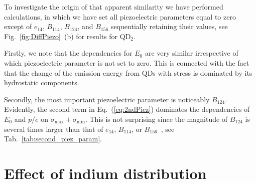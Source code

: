 %


To investigate the origin of that apparent similarity we have performed calculations, in which we have set all piezoelectric parameters equal to zero except of $e_{14}$, $B_{114}$, $B_{124}$, and $B_{156}$ sequentially retaining their values, see Fig.~\ref{fig:DiffPiezo}~(b) for results for QD$_2$. 


Firstly, we note that the dependencies for $E_0$ are very similar irrespective of which piezoelectric parameter is not set to zero. This is connected with the fact that the change of the emission energy from QDs with stress is dominated by its hydrostatic components.

Secondly, the most important piezoelectric parameter is noticeably $B_{124}$. Evidently, the second term in Eq.~(\ref{eq:2ndPiez}) dominates the dependencies of $E_0$ and $p/e$ on $\sigma_{\mathrm{max}}+\sigma_{\mathrm{min}}$. This is not surprising since the magnitude of $B_{124}$ is several times larger than that of $e_{14}$, $B_{114}$, or $B_{156}$~\cite{Beya-Wakata2011}, see Tab.~\ref{tab:second_piez_param}. 


\section{Effect of indium distribution}

